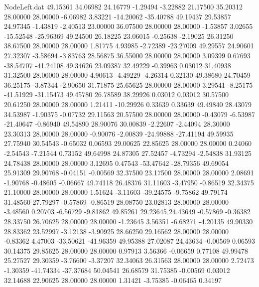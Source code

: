 \begin{filecontents}{NodeLeft.dat}
  49.15361   34.06982   24.16779    -1.29494   -3.22882   21.17500   35.20312   28.00000   28.00000   -6.06982    3.83221  -14.20062  -35.40788
  49.19437   29.53857   24.97345    -1.43819   -2.40513   23.00000   36.07500   28.00000   28.00000   -1.53857    3.02655  -15.52548  -25.96369
  49.24500   26.18225   23.06015    -0.25638   -2.19025   26.31250   38.67500   28.00000   28.00000    1.81775    4.93985   -2.72389  -23.27009
  49.29557   24.90601   27.32307    -3.58694   -3.83763   28.56875   36.55000   28.00000   28.00000    3.09399    0.67693  -38.54707  -41.24108
  49.34626   23.09387   32.49229    -0.39963    0.03012   31.40938   31.32500   28.00000   28.00000    4.90613   -4.49229   -4.26314    0.32130
  49.38680   24.70459   36.25175    -3.87344   -2.90650   31.71875   25.65625   28.00000   28.00000    3.29541   -8.25175  -41.51929  -31.15473
  49.45780   26.78589   38.29926     0.03012    0.03012   30.57500   20.61250   28.00000   28.00000    1.21411  -10.29926    0.33639    0.33639
  49.49840   28.43079   34.53987    -1.90375   -0.07732   29.11563   20.57500   28.00000   28.00000   -0.43079   -6.53987  -21.40647   -0.86940
  49.54890   28.90076   30.00839    -2.22607   -2.44094   28.30000   23.30313   28.00000   28.00000   -0.90076   -2.00839  -24.99888  -27.41194
  49.59935   27.75940   30.54543    -0.65032    0.06593   29.00625   22.85625   28.00000   28.00000    0.24060   -2.54543   -7.21544    0.73152
  49.64998   24.87305   27.52457    -4.73294   -2.54838   31.93125   24.78438   28.00000   28.00000    3.12695    0.47543  -53.47642  -28.79356
  49.69054   25.91309   29.90768    -0.04151   -0.00569   32.37500   23.17500   28.00000   28.00000    2.08691   -1.90768   -0.48605   -0.06667
  49.74118   26.48376   31.11603    -3.47950   -0.86519   32.34375   21.10000   28.00000   28.00000    1.51624   -3.11603  -39.24575   -9.75862
  49.79174   31.48560   27.79297    -0.57869   -0.86519   28.08750   23.02813   28.00000   28.00000   -3.48560    0.20703   -6.56729   -9.81862
  49.85261   29.23645   24.43649    -0.57869   -0.36382   28.33750   26.70625   28.00000   28.00000   -1.23645    3.56351   -6.68271   -4.20135
  49.90330   28.83362   23.52997    -3.12138   -3.90925   28.66250   29.16562   28.00000   28.00000   -0.83362    4.47003  -33.50621  -41.96359
  49.95388   27.02087   24.43634    -0.00569    0.06593   30.14375   29.85625   28.00000   28.00000    0.97913    3.56366   -0.06659    0.77108
  49.99478   25.27527   29.30359    -3.76600   -3.37207   32.34063   26.31563   28.00000   28.00000    2.72473   -1.30359  -41.74334  -37.37684
  50.04541   26.68579   31.75385    -0.00569    0.03012   32.14688   22.90625   28.00000   28.00000    1.31421   -3.75385   -0.06465    0.34197

\end{filecontents}
